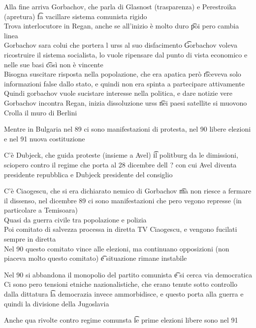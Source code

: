 \documentclass[12pt]{article}
\begin{document}
Alla fine arriva Gorbachov, che parla di Glasnost (trasparenza) e Perestroika (apretura) \t fa vacillare sistema comunista rigido \\
Trova interlocutore in Regan, anche se all'inizio è molto duro \t poi pero cambia linea \\
Gorbachov sara colui che portera l urss al suo disfacimento \t Gorbachov voleva ricostruire il sistema socialista, lo vuole ripensare dal punto di vista economico e nelle sue basi \t così non è vincente \\
Bisogna suscitare risposta nella popolazione, che era apatica però \t riceveva solo informazioni false dallo stato, e quindi non era spinta a partecipare attivamente \\
Quindi gorbachov vuole sucistare interesse nella politica, e dare notizie vere \\
Gorbachov incontra Regan, inizia dissoluzione urss \t nei paesi satellite si muovono \\
Crolla il muro di Berlini

\sss[Bulgaria] 
Mentre in Bulgaria nel 89 ci sono manifestazioni di protesta, nel 90 libere elezioni e nel 91 nuova costituzione

\sss[Ungheria] 
C'è Dubjeck, che guida proteste (insieme a Avel) \t il politburg da le dimissioni, sciopero contro il regime che porta al 28 dicembre dell ? con cui Avel diventa presidente repubblica e Dubjeck presidente del consiglio

\sss[Romania]
C'è Ciaogescu, che si era dichiarato nemico di Gorbachov \t ma non riesce a fermare il dissenso, nel dicembre 89 ci sono manifestazioni che pero vegono represse (in particolare a Temisoara) \\
Quasi da guerra civile tra popolazione e polizia \\
Poi comitato di salvezza processa in diretta TV Ciaogescu, e vengono fucilati sempre in diretta \\
Nel 90 questo comitato vince alle elezioni, ma continuano opposizioni (non piaceva molto questo comitato) \t e situazione rimane instabile

\sss[Jugoslavia]
Nel 90 si abbandona il monopolio del partito comunista \t e si cerca via democratica \\
Ci sono pero tensioni etniche nazionalistiche, che erano tenute sotto controllo dalla dittatura \t la democrazia invece ammorbidisce, e questo porta alla guerra e quindi la divisione della Jugoslavia

\sss[Albania]
Anche qua rivolte contro regime comunsta \t le prime elezioni libere sono nel 91
\end{document}
